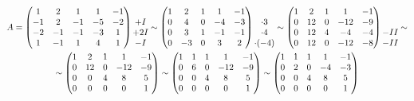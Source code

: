 \begin{multline*}
    A =
    \begin{pmatrix}
        1 & 2 & 1 & 1 & -1 \\
        -1 & 2 & -1 & -5 & -2 \\
        -2 & -1 & -1 & -3 & 1 \\
        1 & -1 & 1 & 4 & 1
    \end{pmatrix}
    \begin{matrix}
        \ \\
        + \rom1 \\
        + 2\rom1 \\
        - \rom1
    \end{matrix} \sim
    \begin{pmatrix}
        1 & 2 & 1 & 1 & -1 \\
        0 & 4 & 0 & -4 & -3 \\
        0 & 3 & 1 & -1 & -1 \\
        0 & -3 & 0 & 3 & 2
    \end{pmatrix}
    \begin{matrix}
        \ \\
        \cdot 3 \\
        \cdot 4 \\
        \cdot (-4)
    \end{matrix} \sim
    \begin{pmatrix}
        1 & 2 & 1 & 1 & -1 \\
        0 & 12 & 0 & -12 & -9 \\
        0 & 12 & 4 & -4 & -4 \\
        0 & 12 & 0 & -12 & -8
    \end{pmatrix}
    \begin{matrix}
        \ \\
        \ \\
        - \rom2 \\
        - \rom2
    \end{matrix} \sim \\
    \sim
    \begin{pmatrix}
    	1 & 2 & 1 & 1 & -1 \\
        0 & 12 & 0 & -12 & -9 \\
        0 & 0 & 4 & 8 & 5 \\
        0 & 0 & 0 & 0 & 1
    \end{pmatrix} \sim
    \begin{pmatrix}
    	1 & 1 & 1 & 1 & -1 \\
        0 & 6 & 0 & -12 & -9 \\
        0 & 0 & 4 & 8 & 5 \\
        0 & 0 & 0 & 0 & 1
    \end{pmatrix} \sim
    \begin{pmatrix}
    	1 & 1 & 1 & 1 & -1 \\
        0 & 2 & 0 & -4 & -3 \\
        0 & 0 & 4 & 8 & 5 \\
        0 & 0 & 0 & 0 & 1
    \end{pmatrix}
\end{multline*}

